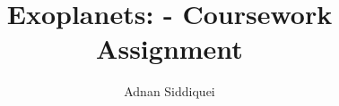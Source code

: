 \documentclass[a4paper,11pt]{article}
\title{\boldmath Exoplanets: - Coursework Assignment}
\author{Adnan Siddiquei}
\affiliation{University of Cambridge}
\newcommand{\inlinecode}[1]{\texttt{\seqsplit{#1}}}
\begin{document}
\maketitle
\flushbottom




\clearpage
\appendix


\begin{thebibliography}{99}

%

\end{thebibliography}
\end{document}
